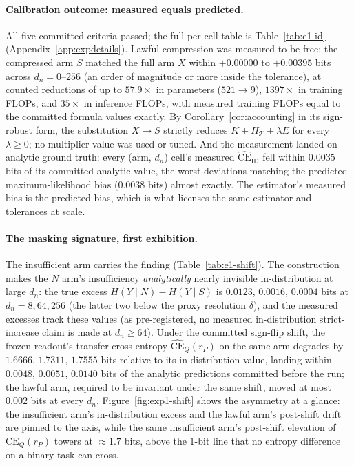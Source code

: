 \documentclass[twocolumn,10pt]{article}
\theoremstyle{definition}
\theoremstyle{remark}
\newcommand{\cT}{\mathcal{T}}
\newcommand{\dn}{d_n}
\newcommand{\lamvar}{\lambda}
\newcommand{\CE}{\mathrm{CE}}
\newcommand{\CEQ}[1]{\CE_{Q}({#1})}
\newcommand{\rP}{r_{P}}
\newcommand{\CEhat}{\widehat{\CE}}
\begin{document}
\paragraph{Calibration outcome: measured equals predicted.} All five
committed criteria passed; the full per-cell table is
Table~\ref{tab:e1-id} (Appendix~\ref{app:expdetails}). Lawful
compression was measured to be free: the compressed arm $S$ matched
the full arm $X$ within $+0.00000$ to $+0.00395$ bits across
$\dn = 0$--$256$ (an order of magnitude or more inside the
tolerance), at counted reductions of up to $57.9\times$ in
parameters ($521 \to 9$), $1397\times$ in training FLOPs, and
$35\times$ in inference FLOPs, with measured training FLOPs equal to
the committed formula values exactly. By
Corollary~\ref{cor:accounting} in its sign-robust form, the
substitution $X \to S$ strictly reduces $K + H_\cT + \lamvar E$ for
every $\lamvar \ge 0$; no multiplier value was used or tuned. And the
measurement landed on analytic ground truth: every (arm, $\dn$)
cell's measured $\CEhat_{\mathrm{ID}}$ fell within $0.0035$ bits of
its committed analytic value, the worst deviations matching the
predicted maximum-likelihood bias ($0.0038$ bits) almost exactly. The
estimator's measured bias is the predicted bias, which is what
licenses the same estimator and tolerances at scale.

\paragraph{The masking signature, first exhibition.} The insufficient arm
carries the finding (Table~\ref{tab:e1-shift}). The construction makes
the $N$ arm's insufficiency \emph{analytically} nearly invisible
in-distribution at large $\dn$: the true excess
$H(Y \mid N) - H(Y \mid S)$ is $0.0123$, $0.0016$, $0.0004$ bits at
$\dn = 8, 64, 256$ (the latter two below the proxy resolution
$\delta$), and the measured excesses track these values (as
pre-registered, no measured in-distribution strict-increase claim is
made at $\dn \ge 64$). Under the committed sign-flip shift, the frozen
readout's transfer cross-entropy $\CEhat_Q(\rP)$ on the same arm
degrades by $1.6666$, $1.7311$, $1.7555$ bits relative to its
in-distribution value, landing within $0.0048$, $0.0051$, $0.0140$
bits of the analytic predictions committed before the run; the lawful
arm, required to be invariant under the same shift, moved at most
$0.002$ bits at every $\dn$. Figure~\ref{fig:exp1-shift} shows the
asymmetry at a glance: the insufficient arm's in-distribution excess
and the lawful arm's post-shift drift are pinned to the axis, while
the same insufficient arm's post-shift elevation of $\CEQ{\rP}$
towers at $\approx 1.7$ bits, above the $1$-bit line that no
entropy difference on a binary task can cross.
\end{document}
